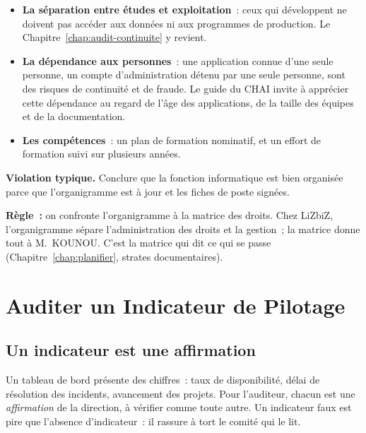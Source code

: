 \begin{itemize}
    \item \textbf{La séparation entre études et exploitation}~: ceux qui
          développent ne doivent pas accéder aux données ni aux programmes
          de production. Le Chapitre~\ref{chap:audit-continuite} y revient.
    \item \textbf{La dépendance aux personnes}~: une application connue
          d'une seule personne, un compte d'administration détenu par une
          seule personne, sont des risques de continuité et de fraude. Le
          guide du CHAI invite à apprécier cette dépendance au regard de
          l'âge des applications, de la taille des équipes et de la
          documentation.
    \item \textbf{Les compétences}~: un plan de formation nominatif, et un
          effort de formation suivi sur plusieurs années.
\end{itemize}

\begin{boxalert}
\textbf{Violation typique.} Conclure que la fonction informatique est bien
organisée parce que l'organigramme est à jour et les fiches de poste
signées.

\smallskip
\textbf{Règle~:} on confronte l'organigramme à la matrice des droits. Chez
LiZbiZ, l'organigramme sépare l'administration des droits et la gestion~;
la matrice donne tout à M.~KOUNOU. C'est la matrice qui dit ce qui se
passe (Chapitre~\ref{chap:planifier}, strates documentaires).
\end{boxalert}

\section{Auditer un Indicateur de Pilotage}
\label{sec:c17-indicateurs}

\subsection{Un indicateur est une affirmation}

Un tableau de bord présente des chiffres~: taux de disponibilité, délai de
résolution des incidents, avancement des projets. Pour l'auditeur, chacun
est une \emph{affirmation} de la direction, à vérifier comme toute autre.
Un indicateur faux est pire que l'absence d'indicateur~: il rassure à tort
le comité qui le lit.

